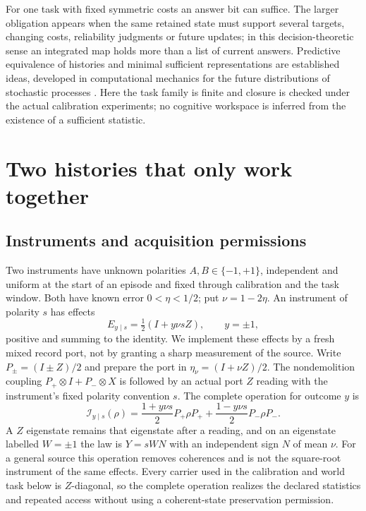 \documentclass[11pt,a4paper]{article}
\begin{document}
For one task with fixed symmetric costs an answer bit can suffice. The larger obligation appears when the same retained state must support several targets, changing costs, reliability judgments or future updates; in this decision-theoretic sense an integrated map holds more than a list of current answers. Predictive equivalence of histories and minimal sufficient representations are established ideas, developed in computational mechanics for the future distributions of stochastic processes \cite{ShaliziCrutchfield}. Here the task family is finite and closure is checked under the actual calibration experiments; no cognitive workspace is inferred from the existence of a sufficient statistic.

\section{Two histories that only work together}\label{sec:model}

\subsection{Instruments and acquisition permissions}

Two instruments have unknown polarities $A,B\in\{-1,+1\}$, independent and uniform at the start of an episode and fixed through calibration and the task window. Both have known error $0<\eta<1/2$; put $\nu=1-2\eta$. An instrument of polarity $s$ has effects
\begin{equation}\label{eq:effects}
 E_{y\mid s}=\tfrac12(I+y\nu sZ),\qquad y=\pm1,
\end{equation}
positive and summing to the identity. We implement these effects by a fresh mixed record port, not by granting a sharp measurement of the source. Write $P_\pm=(I\pm Z)/2$ and prepare the port in $\eta_\nu=(I+\nu Z)/2$. The nondemolition coupling $P_+\otimes I+P_-\otimes X$ is followed by an actual port $Z$ reading with the instrument's fixed polarity convention $s$. The complete operation for outcome $y$ is
\begin{equation}\label{eq:mixedinstrument}
 \mathcal I_{y\mid s}(\rho)
 =\frac{1+y\nu s}{2}P_+\rho P_+
  +\frac{1-y\nu s}{2}P_-\rho P_- .
\end{equation}
A $Z$ eigenstate remains that eigenstate after a reading, and on an eigenstate labelled $W=\pm1$ the law is $Y=sWN$ with an independent sign $N$ of mean $\nu$. For a general source this operation removes coherences and is not the square-root instrument of the same effects. Every carrier used in the calibration and world task below is $Z$-diagonal, so the complete operation realizes the declared statistics and repeated access without using a coherent-state preservation permission.
\end{document}

